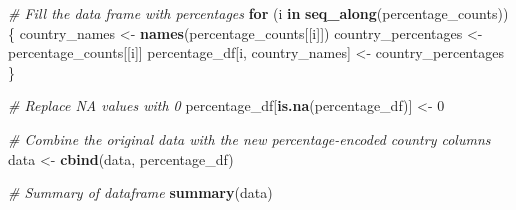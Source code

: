 \documentclass[
]{article}
\newenvironment{Shaded}{\begin{snugshade}}{\end{snugshade}}
\newcommand{\CommentTok}[1]{\textcolor[rgb]{0.56,0.35,0.01}{\textit{#1}}}
\newcommand{\ControlFlowTok}[1]{\textcolor[rgb]{0.13,0.29,0.53}{\textbf{#1}}}
\newcommand{\DecValTok}[1]{\textcolor[rgb]{0.00,0.00,0.81}{#1}}
\newcommand{\FunctionTok}[1]{\textcolor[rgb]{0.13,0.29,0.53}{\textbf{#1}}}
\newcommand{\NormalTok}[1]{#1}
\newcommand{\OtherTok}[1]{\textcolor[rgb]{0.56,0.35,0.01}{#1}}
\begin{document}
\begin{Shaded}
\begin{Highlighting}[]
\CommentTok{\# Fill the data frame with percentages}
\ControlFlowTok{for}\NormalTok{ (i }\ControlFlowTok{in} \FunctionTok{seq\_along}\NormalTok{(percentage\_counts)) \{}
\NormalTok{  country\_names }\OtherTok{\textless{}{-}} \FunctionTok{names}\NormalTok{(percentage\_counts[[i]])}
\NormalTok{  country\_percentages }\OtherTok{\textless{}{-}}\NormalTok{ percentage\_counts[[i]]}
\NormalTok{  percentage\_df[i, country\_names] }\OtherTok{\textless{}{-}}\NormalTok{ country\_percentages}
\NormalTok{\}}

\CommentTok{\# Replace NA values with 0}
\NormalTok{percentage\_df[}\FunctionTok{is.na}\NormalTok{(percentage\_df)] }\OtherTok{\textless{}{-}} \DecValTok{0}

\CommentTok{\# Combine the original data with the new percentage{-}encoded country columns}
\NormalTok{data }\OtherTok{\textless{}{-}} \FunctionTok{cbind}\NormalTok{(data, percentage\_df)}

\CommentTok{\# Summary of dataframe}
\FunctionTok{summary}\NormalTok{(data)}
\end{Highlighting}
\end{Shaded}
\end{document}

